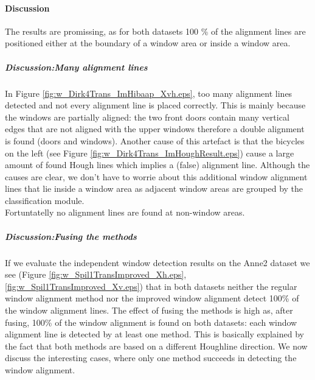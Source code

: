 \paragraph{Discussion}
The results are promissing, as for both datasets 100 \% of the alignment lines
are positioned either at the boundary of a window area or inside a window area.

\subparagraph{Discussion:Many alignment lines}
In Figure \ref{fig:w_Dirk4Trans_ImHibaap_Xvh.eps}, too many alignment lines
detected and not every alignment line is placed correctly.  This is mainly
because the windows are partially aligned: the two front doors contain many
vertical edges that are not aligned with the upper windows therefore a double alignment
is found (doors and windows).  Another cause of this artefact is that the
bicycles on the left (see Figure \ref{fig:w_Dirk4Trans_ImHoughResult.eps}) cause
a large amount of found Hough lines which implies a (false) alignment line.
Although the causes are clear, we don't have to worrie about this additional
window alignment lines that lie inside a window area as adjacent window areas
are grouped by the classification module.\\
Fortuntatelly no alignment lines are found at non-window areas.


\subparagraph{Discussion:Fusing the methods}
If we evaluate the independent window detection results on the Anne2 dataset we see (Figure
\ref{fig:w_Spil1TransImproved_Xh.eps}, \ref{fig:w_Spil1TransImproved_Xv.eps})
that in both datasets neither the regular window alignment method nor the
improved window alignment detect 100\% of the window alignment lines.  The
effect of fusing the methods is high as, after fusing, 100\% of the window
alignment is found on both datasets: each window alignment line is detected by
at least one method.  This is basically explained by the fact that both methods
are based on a different Houghline direction.  We now discuss the interesting
cases, where only one method succeeds in detecting the window alignment.\\

